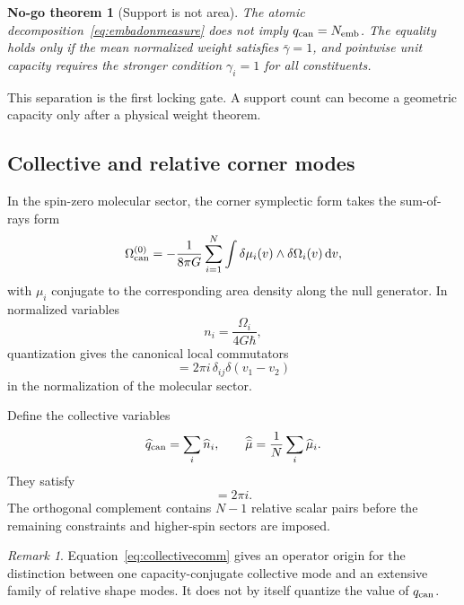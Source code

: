 \documentclass[aps,prd,preprint,nofootinbib,superscriptaddress]{revtex4-2}
\newtheorem{nogotheorem}[theorem]{No-go theorem}
\theoremstyle{definition}
\theoremstyle{remark}
\newtheorem{remark}[theorem]{Remark}
\newcommand{\dd}{\mathrm d}
\begin{document}
\begin{nogotheorem}[Support is not area]
\label{thm:supportnotarea}
The atomic decomposition~\eqref{eq:embadonmeasure} does not imply
$q_{\rm can}=N_{\rm emb}$.  The equality holds only if the mean normalized weight satisfies $\bar\gamma=1$, and pointwise unit capacity requires the stronger condition $\gamma_i=1$ for all constituents.
\end{nogotheorem}

This separation is the first locking gate.  A support count can become a geometric capacity only after a physical weight theorem.

\subsection{Collective and relative corner modes}

In the spin-zero molecular sector, the corner symplectic form takes the sum-of-rays form
\begin{equation}
\Omega^{(0)}_{\rm can}
=
-\frac1{8\pi G}
\sum_{i=1}^{N}
\int
\delta\mu_i(v)\wedge\delta\Omega_i(v)\,\dd v,
\label{eq:molecularsymp}
\end{equation}
with $\mu_i$ conjugate to the corresponding area density along the null generator.  In normalized variables
\begin{equation}
n_i=\frac{\Omega_i}{4G\hbar},
\end{equation}
quantization gives the canonical local commutators
\begin{equation}
[\widehat n_i(v_1),\widehat\mu_j(v_2)]
=
2\pi i\,\delta_{ij}\delta(v_1-v_2)
\label{eq:molecularcomm}
\end{equation}
in the normalization of the molecular sector.

Define the collective variables
\begin{equation}
\widehat q_{\rm can}=\sum_i\widehat n_i,
\qquad
\widehat{\bar\mu}=\frac1N\sum_i\widehat\mu_i.
\label{eq:collective}
\end{equation}
They satisfy
\begin{equation}
[\widehat q_{\rm can},\widehat{\bar\mu}]=2\pi i.
\label{eq:collectivecomm}
\end{equation}
The orthogonal complement contains $N-1$ relative scalar pairs before the remaining constraints and higher-spin sectors are imposed.

\begin{remark}
Equation~\eqref{eq:collectivecomm} gives an operator origin for the distinction between one capacity-conjugate collective mode and an extensive family of relative shape modes.  It does not by itself quantize the value of $q_{\rm can}$.
\end{remark}
\end{document}
